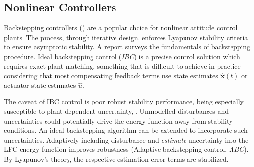 \subsection{Nonlinear Controllers}
\label{subsec:control.attitude.nonlinear}
Backstepping controllers (\cite{satellitebackstepping,intelligentbackstep,backstepslidingmode}) are a popular choice for nonlinear attitude control plants. The process, through iterative design, enforces Lyapunov stability criteria to ensure asymptotic stability. A report \cite{backstepping} surveys the fundamentals of backstepping procedure. Ideal backstepping control (\emph{IBC}) is a precise control solution which requires exact plant matching, something that is difficult to achieve in practice considering that most compensating feedback terms use state estimates $\hat{\mathbf{x}}(t)$ or actuator state estimates $\hat{u}$. 
\par
The caveat of IBC control is poor robust stability performance, being especially susceptible to plant dependent uncertainty, \cite{robustbackstepping}. Unmodelled disturbances and uncertainties could potentially drive the energy function away from stability conditions. An ideal backstepping algorithm can be extended to incorporate such uncertainties. Adaptively including disturbance and \emph{estimate} uncertainty into the LFC energy function improves robustness (Adaptive backstepping control, \emph{ABC}). By Lyapunov's theory, the respective estimation error terms are stabilized.
